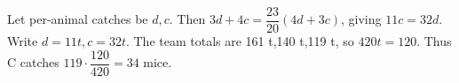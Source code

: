 Let per-animal catches be $ d,c $. Then $ 3d+4c=\dfrac{23}{20}(4d+3c)$, giving $ 11c=32d $. Write $ d=11t,c=32t $. The team totals are 161 t,140 t,119 t, so $ 420t=120 $. Thus C catches $ 119\cdot\dfrac{120}{420}=\boxed{34}$ mice.
